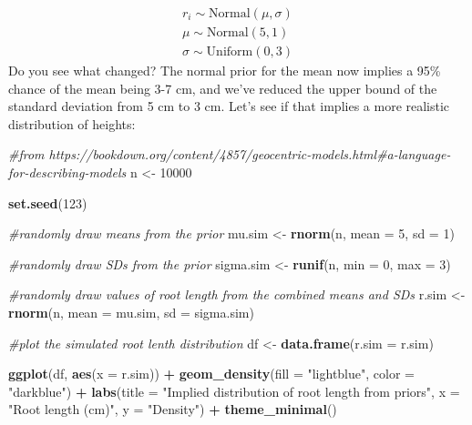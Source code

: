 \documentclass[
]{book}
\newenvironment{Shaded}{\begin{snugshade}}{\end{snugshade}}
\newcommand{\AttributeTok}[1]{\textcolor[rgb]{0.13,0.29,0.53}{#1}}
\newcommand{\CommentTok}[1]{\textcolor[rgb]{0.56,0.35,0.01}{\textit{#1}}}
\newcommand{\DecValTok}[1]{\textcolor[rgb]{0.00,0.00,0.81}{#1}}
\newcommand{\FunctionTok}[1]{\textcolor[rgb]{0.13,0.29,0.53}{\textbf{#1}}}
\newcommand{\NormalTok}[1]{#1}
\newcommand{\OtherTok}[1]{\textcolor[rgb]{0.56,0.35,0.01}{#1}}
\newcommand{\SpecialCharTok}[1]{\textcolor[rgb]{0.81,0.36,0.00}{\textbf{#1}}}
\newcommand{\StringTok}[1]{\textcolor[rgb]{0.31,0.60,0.02}{#1}}
\begin{document}
\[
\begin{array}{l}
r_i \sim \mathrm{Normal}(\mu, \sigma) \\
\mu \sim \mathrm{Normal}(5, 1) \\
\sigma \sim \mathrm{Uniform}(0, 3)
\end{array}
\] Do you see what changed? The normal prior for the mean now implies a 95\% chance of the mean being 3-7 cm, and we've reduced the upper bound of the standard deviation from 5 cm to 3 cm. Let's see if that implies a more realistic distribution of heights:

\begin{Shaded}
\begin{Highlighting}[]
\CommentTok{\#from https://bookdown.org/content/4857/geocentric{-}models.html\#a{-}language{-}for{-}describing{-}models}
\NormalTok{n }\OtherTok{\textless{}{-}} \DecValTok{10000}

\FunctionTok{set.seed}\NormalTok{(}\DecValTok{123}\NormalTok{)}

\CommentTok{\#randomly draw means from the prior}
\NormalTok{mu.sim }\OtherTok{\textless{}{-}} \FunctionTok{rnorm}\NormalTok{(n, }\AttributeTok{mean =} \DecValTok{5}\NormalTok{, }\AttributeTok{sd =} \DecValTok{1}\NormalTok{)}

\CommentTok{\#randomly draw SDs from the prior}
\NormalTok{sigma.sim }\OtherTok{\textless{}{-}} \FunctionTok{runif}\NormalTok{(n, }\AttributeTok{min =} \DecValTok{0}\NormalTok{, }\AttributeTok{max =} \DecValTok{3}\NormalTok{)}

\CommentTok{\#randomly draw values of root length from the combined means and SDs}
\NormalTok{r.sim }\OtherTok{\textless{}{-}} \FunctionTok{rnorm}\NormalTok{(n, }\AttributeTok{mean =}\NormalTok{ mu.sim, }\AttributeTok{sd =}\NormalTok{ sigma.sim)}

\CommentTok{\#plot the simulated root lenth distribution}
\NormalTok{df }\OtherTok{\textless{}{-}} \FunctionTok{data.frame}\NormalTok{(}\AttributeTok{r.sim =}\NormalTok{ r.sim)}

\FunctionTok{ggplot}\NormalTok{(df, }\FunctionTok{aes}\NormalTok{(}\AttributeTok{x =}\NormalTok{ r.sim)) }\SpecialCharTok{+}
  \FunctionTok{geom\_density}\NormalTok{(}\AttributeTok{fill =} \StringTok{"lightblue"}\NormalTok{, }\AttributeTok{color =} \StringTok{"darkblue"}\NormalTok{) }\SpecialCharTok{+}
  \FunctionTok{labs}\NormalTok{(}\AttributeTok{title =} \StringTok{"Implied distribution of root length from priors"}\NormalTok{,}
       \AttributeTok{x =} \StringTok{"Root length (cm)"}\NormalTok{,}
       \AttributeTok{y =} \StringTok{"Density"}\NormalTok{) }\SpecialCharTok{+}
  \FunctionTok{theme\_minimal}\NormalTok{()}
\end{Highlighting}
\end{Shaded}
\end{document}
